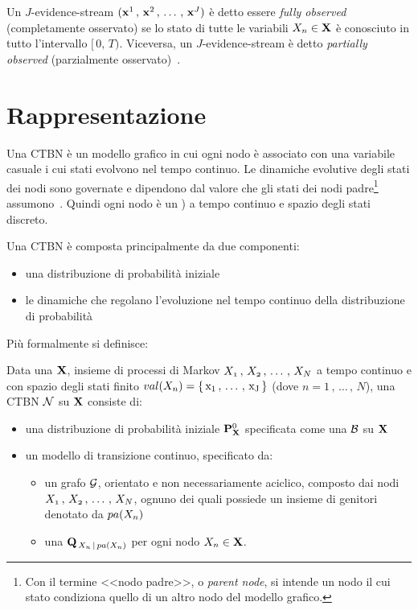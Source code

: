 Un $J$-evidence-stream $(\mathbf{x}^1\,,\,\mathbf{x}^2\,,\,\dotsc\,,\,\mathbf{x}^J)$ è detto essere \emph{fully observed} (completamente osservato) se lo stato di tutte le variabili $\mathnormal{X_n}\in\mathbf{X}$ è conosciuto in tutto l'intervallo $[\,0,\,T)$. Viceversa, un $J$-evidence-stream è detto \emph{partially observed} (parzialmente osservato)~\cite{Stella2012}.

\section{Rappresentazione}
\label{sec:ctbn-rappresentazione}
Una \acl{CTBN} è un modello grafico in cui ogni nodo è associato con una variabile casuale i cui stati evolvono nel tempo continuo. Le dinamiche evolutive degli stati dei nodi sono governate e dipendono dal valore che gli stati dei nodi padre\footnote{Con il termine <<nodo padre>>, o \emph{parent node}, si intende un nodo il cui stato condiziona quello di un altro nodo del modello grafico.} assumono~\cite{Stella2012}. Quindi ogni nodo è un \mprocess*{} \cond*{} ) a tempo continuo e spazio degli stati discreto.

Una \acs{CTBN} è composta principalmente da due componenti:
\begin{itemize}
    \item una distribuzione di probabilità iniziale
    \item le dinamiche che regolano l'evoluzione nel tempo continuo della distribuzione di probabilità
\end{itemize}
Più formalmente si definisce:
\begin{definizione}
\label{defn:ctbn}
Data una  $\mathbf{X}$, insieme di processi di Markov $\mathnormal{X_1}\,,\,\mathnormal{X_2}\,,\,\dotsc\,,\,\mathnormal{X_N}$ a tempo continuo e con spazio degli stati finito $val(\mathnormal{X_n})=\{\,\mathrm{x_1}\,,\,\dotsc\,,\,\mathrm{x_J}\,\}$ (dove $n=1\,,\,\dotsc\,,\,N$), una \acs{CTBN} $\mathcal{N}$ su $\mathbf{X}$ consiste di:
\begin{itemize}
    \item una distribuzione di probabilità iniziale $\mathbf{P}^0_{\mathbf{X}}$ specificata come una \bn{} $\mathcal{B}$ su $\mathbf{X}$
    \item un modello di transizione continuo, specificato da:
    \begin{itemize}
        \item un grafo $\mathcal{G}$, orientato e non necessariamente aciclico, composto dai nodi $\mathnormal{X_1}\,,\,\mathnormal{X_2}\,,\,\dotsc\,,\,\mathnormal{X_N}$, ognuno dei quali possiede un insieme di genitori denotato da $pa(\mathnormal{X_n})$
        \item una \im*{} \cond*{} $\mathbf{Q}_{\,\mathnormal{X_n}\,\arrowvert\,pa(\mathnormal{X_n})}$ per ogni nodo $\mathnormal{X_n} \in \mathbf{X}$.
    \end{itemize}
\end{itemize}
\end{definizione}

